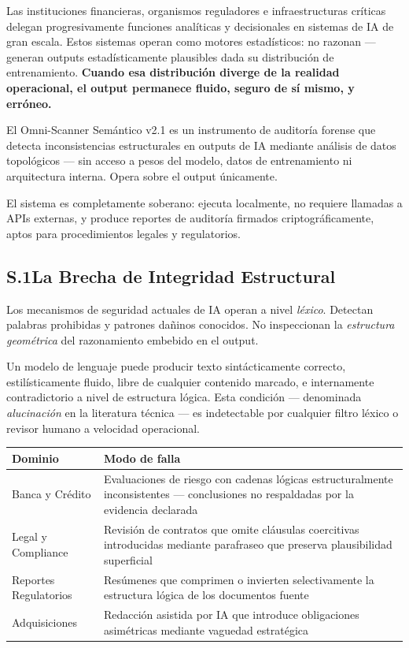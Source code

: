 \documentclass[11pt, a4paper]{article}
\begin{document}
\begin{statbox}
Las instituciones financieras, organismos reguladores e infraestructuras críticas
delegan progresivamente funciones analíticas y decisionales en sistemas de IA de
gran escala. Estos sistemas operan como motores estadísticos: no razonan ---
generan outputs estadísticamente plausibles dada su distribución de entrenamiento.
\textbf{Cuando esa distribución diverge de la realidad operacional, el output
permanece fluido, seguro de sí mismo, y erróneo.}

El Omni-Scanner Semántico v2.1 es un instrumento de auditoría forense que detecta
inconsistencias estructurales en outputs de IA mediante análisis de datos topológicos
--- sin acceso a pesos del modelo, datos de entrenamiento ni arquitectura interna.
Opera sobre el output únicamente.

El sistema es completamente soberano: ejecuta localmente, no requiere llamadas a
APIs externas, y produce reportes de auditoría firmados criptográficamente, aptos
para procedimientos legales y regulatorios.
\end{statbox}

\subsection*{S.1\quad La Brecha de Integridad Estructural}

Los mecanismos de seguridad actuales de IA operan a nivel \emph{léxico}. Detectan
palabras prohibidas y patrones dañinos conocidos. No inspeccionan la
\emph{estructura geométrica} del razonamiento embebido en el output.

Un modelo de lenguaje puede producir texto sintácticamente correcto, estilísticamente
fluido, libre de cualquier contenido marcado, e internamente contradictorio a nivel
de estructura lógica. Esta condición --- denominada \emph{alucinación} en la literatura
técnica --- es indetectable por cualquier filtro léxico o revisor humano a velocidad
operacional.

\begin{alertbox}
\begin{tabularx}{\linewidth}{lX}
\toprule
\textbf{Dominio} & \textbf{Modo de falla} \\
\midrule
Banca y Crédito & Evaluaciones de riesgo con cadenas lógicas estructuralmente
  inconsistentes --- conclusiones no respaldadas por la evidencia declarada \\
Legal y Compliance & Revisión de contratos que omite cláusulas coercitivas
  introducidas mediante parafraseo que preserva plausibilidad superficial \\
Reportes Regulatorios & Resúmenes que comprimen o invierten selectivamente la
  estructura lógica de los documentos fuente \\
Adquisiciones & Redacción asistida por IA que introduce obligaciones asimétricas
  mediante vaguedad estratégica \\
\bottomrule
\end{tabularx}
\end{alertbox}
\end{document}
